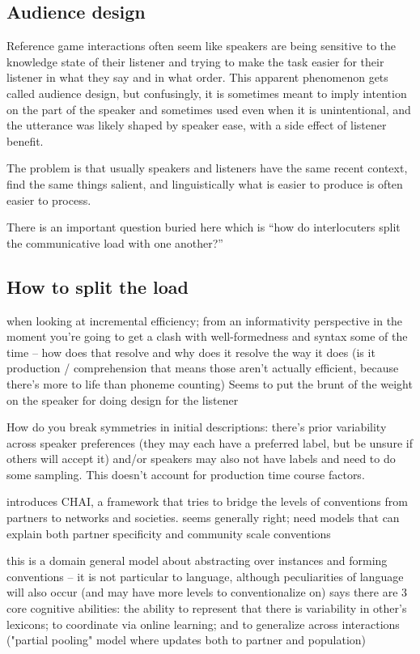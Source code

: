 \documentclass[]{article}
\begin{document}
\subsection{Audience design}

Reference game interactions often seem like speakers are being sensitive to the knowledge state of their listener and trying to make the task easier for their listener in what they say and in what order. This apparent phenomenon gets called audience design, but confusingly, it is sometimes meant to imply intention on the part of the speaker and sometimes used even when it is unintentional, and the utterance was likely shaped by speaker ease, with a side effect of listener benefit. 

The problem is that usually speakers and listeners have the same recent context, find the same things salient, and linguistically what is easier to produce is often easier to process. 

There is an important question buried here which is ``how do interlocuters split the communicative load with one another?''



\subsection{How to split the load}
\cite{rubio-fernandez2021} when looking at incremental efficiency; from an informativity perspective in the moment you're going to get a clash with well-formedness and syntax some of the time -- how does that resolve and why does it resolve the way it does (is it production / comprehension that means those aren't actually efficient, because there's more to life than phoneme counting) Seems to put the brunt of the weight on the speaker for doing design for the listener 


\cite{hawkins2020b} How do you break symmetries in initial descriptions: there's prior variability across speaker preferences (they may each have a preferred label, but be unsure if others will accept it) and/or speakers may also not have labels and need to do some sampling. This doesn't account for production time course factors. 

\cite{hawkins2021} introduces CHAI, a framework that tries to bridge the levels of conventions from partners to networks and societies. seems generally right; need models that can explain both partner specificity and community scale conventions

this is a domain general model about abstracting over instances and forming conventions -- it is not particular to language, although peculiarities of language will also occur (and may have more levels to conventionalize on) 
\cite{hawkins2021} says there are 3 core cognitive abilities: the ability to represent that there is variability in other's lexicons; to coordinate via online learning; and to generalize across interactions ("partial pooling" model where updates both to partner and population) 
\end{document}
